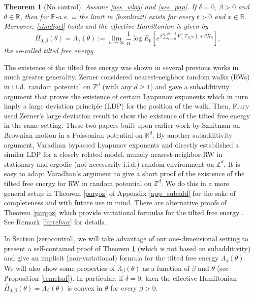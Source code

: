 \documentclass[a4paper]{amsart}
\numberwithin{equation}{section}
\theoremstyle{plain}
\newtheorem{theorem}{\sc Theorem}[section]
\theoremstyle{remark}
\begin{document}
\begin{theorem}[No control]\label{thmno}
Assume \eqref{ass_wlog} and \eqref{ass_pan}. If $\delta = 0$, $\beta > 0$ and $\theta\in\mathbb{R}$, then for $\mathbb{P}$-a.e.\ $\omega$ the limit in \eqref{homlimit} exists for every $t>0$ and $x\in\mathbb{R}$. Moreover, \eqref{simdigel} holds and the effective Hamiltonian is given by
\begin{equation}\label{nolimit}
\overline H_{0,\beta}(\theta) = \Lambda_\beta(\theta) := \lim_{n\to\infty}\frac1{n}\log E_0\left[e^{\beta\sum_{i=0}^{n-1}V(T_{X_i}\omega) + \theta X_n}\right],
\end{equation}
the so-called tilted free energy.
\end{theorem}

The existence of the tilted free energy was shown in several previous works in much greater generality. 
Zerner \cite{Zer1998} considered nearest-neighbor random walks (RWs) in i.i.d.\ random potential on $\mathbb{Z}^d$ (with any $d\ge1$) and gave a subadditivity argument that proves the existence of certain Lyapunov exponents which in turn imply a large deviation principle (LDP) for the position of the walk. Then, Flury \cite{Flu2007} used Zerner's large deviation result to show the existence of the tilted free energy in the same setting. These two papers built upon earlier work by Sznitman \cite{Szn1994} on Brownian motion in a Poissonian potential on $\mathbb{R}^d$. By another subadditivity argument, Varadhan \cite{Var2003} bypassed Lyapunov exponents and directly established a similar LDP for a closely related model, namely nearest-neighbor RW in stationary and ergodic (not necessarily i.i.d.) random environment on $\mathbb{Z}^d$. It is easy to adapt Varadhan's argument to give a short proof of the existence of the tilted free energy for RW in random potential on $\mathbb{Z}^d$. We do this {}{in a more general setup
  in Theorem \ref{pargoz} of} 
Appendix \ref{app_subadd} for the sake of completeness 
and with future use in mind. 
There are alternative proofs of Theorem \ref{pargoz} which provide variational formulas for the tilted free energy \cite{Yil2009,RasSepYil2013,RasSep2014,RasSepYil2017}. See Remark \ref{furrefvar} for details.

In Section \ref{zerocontrol}, we will take advantage of our one-dimensional setting to present a self-contained proof of Theorem \ref{thmno} (which is not based on subadditivity) and give an implicit (non-variational) formula 
for the tilted free energy $\Lambda_\beta(\theta)$. 
We will also show some properties of $\Lambda_\beta(\theta)$ as a function of $\beta$ and $\theta$ (see Proposition \ref{temelsaf}). In particular, if $\delta = 0$, then the effective Hamiltonian $\overline H_{0,\beta}(\theta) = \Lambda_\beta(\theta)$ is convex in $\theta$ for every $\beta>0$.
\end{document}
